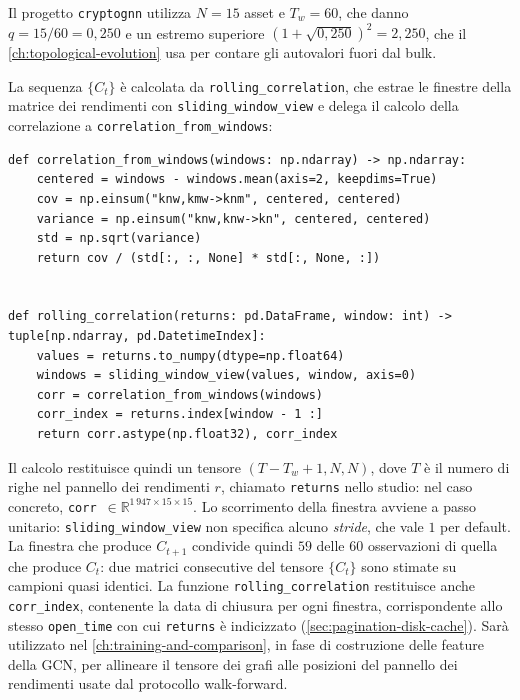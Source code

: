 Il progetto \texttt{cryptognn} utilizza $N=15$ asset e $T_w=60$, che danno $q=15/60=0{,}250$ e un estremo superiore $(1+\sqrt{0{,}250})^2=2{,}250$, che il \cref{ch:topological-evolution} usa per contare gli autovalori fuori dal bulk.

La sequenza $\{C_t\}$ è calcolata da \texttt{rolling\_correlation}, che estrae le finestre della matrice dei rendimenti con \texttt{sliding\_window\_view} e delega il calcolo della correlazione a \texttt{correlation\_from\_windows}:

\begin{listing}[H]
\begin{verbatim}
def correlation_from_windows(windows: np.ndarray) -> np.ndarray:
    centered = windows - windows.mean(axis=2, keepdims=True)
    cov = np.einsum("knw,kmw->knm", centered, centered)
    variance = np.einsum("knw,knw->kn", centered, centered)
    std = np.sqrt(variance)
    return cov / (std[:, :, None] * std[:, None, :])


def rolling_correlation(returns: pd.DataFrame, window: int) -> tuple[np.ndarray, pd.DatetimeIndex]:
    values = returns.to_numpy(dtype=np.float64)
    windows = sliding_window_view(values, window, axis=0)
    corr = correlation_from_windows(windows)
    corr_index = returns.index[window - 1 :]
    return corr.astype(np.float32), corr_index
\end{verbatim}
\caption{\texttt{correlation\_from\_windows} e \texttt{rolling\_correlation}}
\label{lst:rolling-correlation}
\end{listing}

Il calcolo restituisce quindi un tensore $(T-T_w+1, N, N)$, dove $T$ è il numero di righe nel pannello dei rendimenti $r$, chiamato \texttt{returns} nello studio: nel caso concreto, \texttt{corr}~$\in\mathbb{R}^{1\,947\times15\times15}$. Lo scorrimento della finestra avviene a passo unitario: \texttt{sliding\_window\_view} non specifica alcuno \emph{stride}, che vale $1$ per default. La finestra che produce $C_{t+1}$ condivide quindi $59$ delle $60$ osservazioni di quella che produce $C_t$: due matrici consecutive del tensore $\{C_t\}$ sono stimate su campioni quasi identici. La funzione \texttt{rolling\_correlation} restituisce anche \texttt{corr\_index}, contenente la data di chiusura per ogni finestra, corrispondente allo stesso \texttt{open\_time} con cui \texttt{returns} è indicizzato (\cref{sec:pagination-disk-cache}). Sarà utilizzato nel \cref{ch:training-and-comparison}, in fase di costruzione delle feature della GCN, per allineare il tensore dei grafi alle posizioni del pannello dei rendimenti usate dal protocollo walk-forward.

